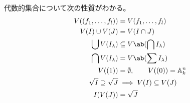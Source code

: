 \documentclass[uplatex,dvipdfmx,a4paper,11pt]{jlreq}
\renewcommand{\AA}{\mathbb{A}}
\numberwithin{equation}{section}
\theoremstyle{definition}
\begin{document}
\begin{proposition}
  代数的集合について次の性質がわかる。
  \begin{align}
    V((f_1,\ldots,f_l))       & = V(f_1,\ldots,f_l)                  \\
    V(I)\cup V(J)             & = V(I\cap J)                         \\
    \bigcup V(I_\lambda)      & \subseteq V\ab(\bigcap I_\lambda)    \\
    \bigcap V(I_\lambda)      & = V\ab(\sum I_\lambda)               \\
    V((1))                    & = \emptyset, \qquad V((0)) = \AA_k^n \\
    \sqrt{I}\supseteq\sqrt{J} & \implies V(I)\subseteq V(J)          \\
    I(V(J))                   & = \sqrt{J}
  \end{align}
\end{proposition}
\end{document}
